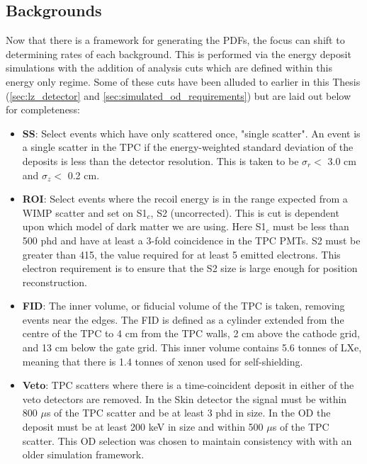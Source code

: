 \subsection{Backgrounds}
\par
Now that there is a framework for generating the PDFs, the focus can shift to determining rates of each background.
This is performed via the energy deposit simulations with the addition of analysis cuts which are defined within this energy only regime.
Some of these cuts have been alluded to earlier in this Thesis (\autoref{sec:lz_detector} and \autoref{sec:simulated_od_requirements}) but are laid out below for completeness:
\begin{itemize}
    \item \textbf{SS}: Select events which have only scattered once, "single scatter". An event is a single scatter in the TPC if the energy-weighted standard deviation of the deposits is less than the detector resolution. This is taken to be $\sigma_r <$ 3.0 cm and $\sigma_z <$ 0.2 cm.
    \item \textbf{ROI}: Select events where the recoil energy is in the range expected from a WIMP scatter and set on S1$_c$, S2 (uncorrected). This is cut is dependent upon which model of dark matter we are using. Here S1$_c$ must be less than 500 phd and have at least a 3-fold coincidence in the TPC PMTs. S2 must be greater than 415, the value required for at least 5 emitted electrons. This electron requirement is to ensure that the S2 size is large enough for position reconstruction.
    \item \textbf{FID}: The inner volume, or fiducial volume of the TPC is taken, removing events near the edges. The FID is defined as a cylinder extended from the centre of the TPC to 4 cm from the TPC walls, 2 cm above the cathode grid, and 13 cm below the gate grid. This inner volume contains 5.6 tonnes of LXe, meaning that there is 1.4 tonnes of xenon used for self-shielding.
    \item \textbf{Veto}: TPC scatters where there is a time-coincident deposit in either of the veto detectors are removed. In the Skin detector the signal must be within 800 $\mu$s of the TPC scatter and be at least 3 phd in size. In the OD the deposit must be at least 200 keV in size and within 500 $\mu$s of the TPC scatter. This OD selection was chosen to maintain consistency with \cite{LZ_projected_sensitivity_paper_ref} with an older simulation framework.
\end{itemize}

